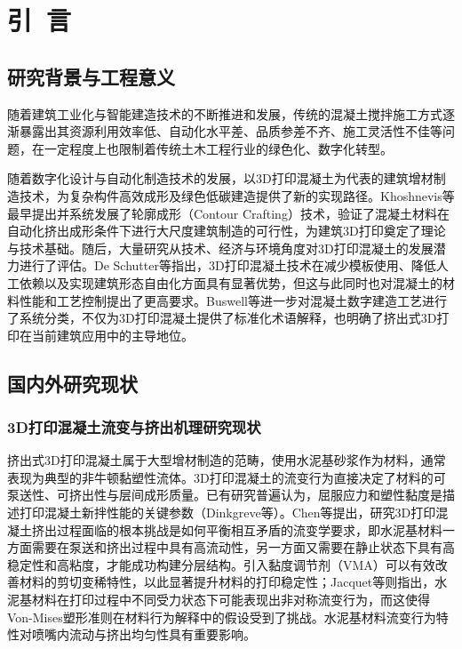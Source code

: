 \chapter{引~言}\label{chap:introduction}

\section{研究背景与工程意义}

随着建筑工业化与智能建造技术的不断推进和发展，传统的混凝土搅拌施工方式逐渐暴露出其资源利用效率低、自动化水平差、品质参差不齐、施工灵活性不佳等问题，在一定程度上也限制着传统土木工程行业的绿色化、数字化转型。

随着数字化设计与自动化制造技术的发展，以3D打印混凝土为代表的建筑增材制造技术，为复杂构件高效成形及绿色低碳建造提供了新的实现路径。Khoshnevis等\cite{khoshnevis2004,khoshnevis2006}最早提出并系统发展了轮廓成形（Contour Crafting）技术，验证了混凝土材料在自动化挤出成形条件下进行大尺度建筑制造的可行性，为建筑3D打印奠定了理论与技术基础。随后，大量研究从技术、经济与环境角度对3D打印混凝土的发展潜力进行了评估。De Schutter等\cite{deschutter2018}指出，3D打印混凝土技术在减少模板使用、降低人工依赖以及实现建筑形态自由化方面具有显著优势，但这与此同时也对混凝土的材料性能和工艺控制提出了更高要求。Buswell等\cite{buswell2020}进一步对混凝土数字建造工艺进行了系统分类，不仅为3D打印混凝土提供了标准化术语解释，也明确了挤出式3D打印在当前建筑应用中的主导地位。

\section{国内外研究现状}

\subsection{3D打印混凝土流变与挤出机理研究现状}

挤出式3D打印混凝土属于大型增材制造的范畴，使用水泥基砂浆作为材料，通常表现为典型的非牛顿黏塑性流体。3D打印混凝土的流变行为直接决定了材料的可泵送性、可挤出性与层间成形质量。已有研究普遍认为，屈服应力和塑性黏度是描述打印混凝土新拌性能的关键参数（Dinkgreve等\cite{dinkgreve2016}）。Chen等\cite{chen2020}提出，研究3D打印混凝土挤出过程面临的根本挑战是如何平衡相互矛盾的流变学要求，即水泥基材料一方面需要在泵送和挤出过程中具有高流动性，另一方面又需要在静止状态下具有高稳定性和高粘度，才能成功构建分层结构。引入黏度调节剂（VMA）可以有效改善材料的剪切变稀特性，以此显著提升材料的打印稳定性；Jacquet等\cite{jacquet2021}则指出，水泥基材料在打印过程中不同受力状态下可能表现出非对称流变行为，而这使得Von-Mises塑形准则在材料行为解释中的假设受到了挑战。水泥基材料流变行为特性对喷嘴内流动与挤出均匀性具有重要影响。

